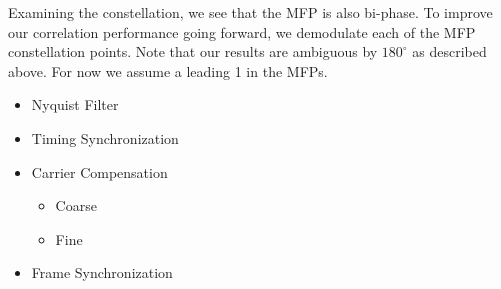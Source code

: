 \documentclass[conference,onecolumn]{IEEEtran}
\begin{document}
Examining the constellation, we see that the MFP is also bi-phase. To 
improve our correlation performance going forward, we demodulate each of the MFP constellation points. Note that our results are ambiguous by $180^{\circ}$ as described above. For now we assume a leading 1 in the MFPs.



\begin{itemize}
	\item Nyquist Filter
	\item Timing Synchronization
	\item Carrier Compensation
	\begin{itemize}
		\item Coarse
		\item Fine
	\end{itemize}
	\item Frame Synchronization
\end{itemize}



\printbibliography

%
\end{document}

